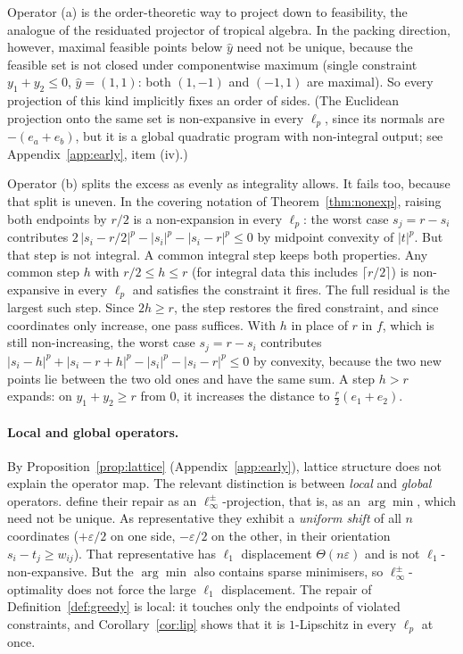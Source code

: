 Operator (a) is the order-theoretic way to project down to feasibility, the analogue of the
residuated projector of tropical algebra. In the packing direction, however, maximal feasible
points below $\hat{y}$ need not be unique, because the feasible set is not closed under
componentwise maximum (single constraint $y_1 + y_2 \le 0$, $\hat{y} = (1,1)$: both $(1,-1)$ and
$(-1,1)$ are maximal). So every projection of this kind implicitly fixes an order of sides. (The
Euclidean projection onto the same set is non-expansive in every $\ell_p$, since its normals are
$-(e_a + e_b)$, but it is a global quadratic program with non-integral output; see
Appendix~\ref{app:early}, item (iv).)

Operator (b) splits the excess as evenly as integrality allows. It fails too, because that split is
uneven. In the covering notation of Theorem~\ref{thm:nonexp}, raising both endpoints by $r/2$ is a
non-expansion in every $\ell_p$: the worst case $s_j = r - s_i$ contributes
$2\,|s_i - r/2|^p - |s_i|^p - |s_i - r|^p \le 0$ by midpoint convexity of $|t|^p$. But that step
is not integral. A common integral step keeps both properties. Any common step $h$
with $r/2 \le h \le r$ (for integral data this includes $\lceil r/2 \rceil$) is non-expansive in
every $\ell_p$ and satisfies the constraint it fires. The full residual is the largest such step.
Since $2h \ge r$, the step restores the fired constraint, and since coordinates only increase, one
pass suffices. With $h$ in place of $r$ in $f$, which is still non-increasing, the worst case
$s_j = r - s_i$ contributes $|s_i - h|^p + |s_i - r + h|^p - |s_i|^p - |s_i - r|^p \le 0$ by
convexity, because the two new points lie between the two old ones and have the same sum. A step
$h > r$ expands: on $y_1 + y_2 \ge r$ from $0$, it increases the distance to
$\tfrac{r}{2}(e_1 + e_2)$.

\paragraph{Local and global operators.} By Proposition~\ref{prop:lattice} (Appendix~\ref{app:early}),
lattice structure does not explain the operator map. The relevant distinction
is between \emph{local} and \emph{global} operators. \citeauthor{sakaue2022} define their
repair as an $\ell_\infty^{\pm}$-projection, that is, as an $\arg\min$, which need not be unique. As
representative they exhibit a \emph{uniform shift} of all $n$ coordinates ($+\varepsilon/2$ on one
side, $-\varepsilon/2$ on the other, in their orientation $s_i - t_j \ge w_{ij}$). That
representative has $\ell_1$ displacement $\Theta(n\varepsilon)$ and is not $\ell_1$-non-expansive.
But the $\arg\min$ also contains sparse minimisers, so $\ell_\infty^\pm$-optimality does not force
the large $\ell_1$ displacement. The repair of Definition~\ref{def:greedy}
is local: it touches only the endpoints of violated constraints, and Corollary~\ref{cor:lip} shows
that it is $1$-Lipschitz in every $\ell_p$ at once.

